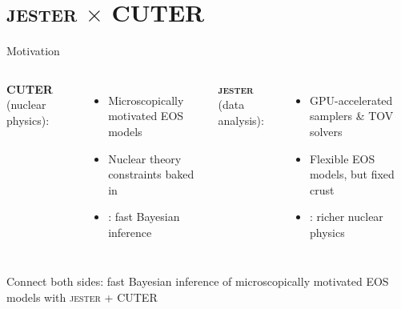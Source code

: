 \documentclass[usenames,dvipsnames,t]{beamer}
\begin{document}
\section{\textsc{jester} $\times$ CUTER}

\begin{frame}{Motivation}
  \def\x{5mm}
  \def\y{2mm}

  \begin{columns}[t]
    \textbf{CUTER} (nuclear physics):
    \begin{itemize}
      \vspace{\y}
      \item Microscopically motivated EOS models
      \vspace{\y}
      \item Nuclear theory constraints baked in
      \vspace{\y}
      \item {}: fast Bayesian inference
    \end{itemize}

    \textbf{\textsc{jester}} (data analysis):
    \begin{itemize}
      \vspace{\y}
      \item GPU-accelerated samplers \& TOV solvers
      \vspace{\y}
      \item Flexible EOS models, but fixed crust
      \vspace{\y}
      \item {}: richer nuclear physics
    \end{itemize}
  \end{columns}

  \vspace{\x}
  \pause

  \begin{tcolorbox}[colback=blue!5!white,colframe=blue!75!black,title=Goal]
    Connect both sides: fast Bayesian inference of microscopically motivated EOS models with \textsc{jester} + CUTER
  \end{tcolorbox}

\end{frame}
\end{document}
